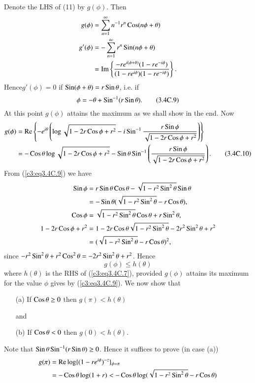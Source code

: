 \medskip
{}
Denote the LHS of (11) by $g(\phi)$. Then
\begin{align*}
g(\phi) & = \sum\limits^\infty_{n=1} n^{-1} r^n \operatorname{Cos} (n\phi + \theta)\\
g'(\phi) & = -\sum\limits^{\infty}_{n=1} r^n \operatorname{Sin} (n\phi + \theta)\\
& = \operatorname{Im} \left\{ \frac{-re^{i(\phi + \theta)} (1-re^{-i\phi})}{(1-re^{i\phi}) (1-re^{-i\phi})}\right\}. 
\end{align*}
Hence\pageoriginale $g'(\phi) = 0$ if $\operatorname{Sin} (\phi + \theta) = r \operatorname{Sin} \theta$, i.e. if
\begin{equation*}
\phi = -\theta + \operatorname{Sin}^{-1} (r \operatorname{Sin} \theta).  \tag{3.4C.9}\label{c3:eq3.4C.9}
\end{equation*}
At this point $g(\phi)$ attains the maximum as we shall show in the end. Now
{\fontsize{10}{12}\selectfont
\begin{align*}
g(\phi) & = \operatorname{Re} \left\{ -e^{i\theta} \left(\log \sqrt{1-2r \operatorname{Cos} \phi + r^2} - i \operatorname{Sin}^{-1} \frac{r \operatorname{Sin} \phi}{\sqrt{1 - 2 r \operatorname{Cos} \phi + r^2}} \right)\right\}\\
& = - \operatorname{Cos} \theta \log \sqrt{1-2r \operatorname{Cos} \phi + r^2} - \operatorname{Sin} \theta \operatorname{Sin}^{-1} \left( \frac{r \operatorname{Sin} \phi}{\sqrt{1-2r \operatorname{Cos} \phi + r^2}}\right). \tag{3.4C.10}\label{c3:eq3.4C.10}
\end{align*}}
From (\ref{c3:eq3.4C.9}) we have
\begin{align*}
\operatorname{Sin} \phi & = r \operatorname{Sin} \theta \operatorname{Cos} \theta - \sqrt{1-r^2 \operatorname{Sin}^2 \theta} \operatorname{Sin} \theta\\
& = - \operatorname{Sin} \theta (\sqrt{1-r^2 \operatorname{Sin}^2 \theta} - r \operatorname{Cos} \theta),\\
\operatorname{Cos} \phi & = \sqrt{1-r^2 \operatorname{Sin}^2 \theta} \operatorname{Cos} \theta + r \operatorname{Sin}^2 \theta,\\
1-2r\operatorname{Cos} \phi + r^2 & = 1 -2r \operatorname{Cos} \theta \sqrt{1-r^2 \operatorname{Sin}^2 \theta} - 2r^2 \operatorname{Sin}^2 \theta + r^2\\
& = (\sqrt{1-r^2 \operatorname{Sin}^2 \theta} - r \operatorname{Cos} \theta)^2,
\end{align*}
since $-r^2 \operatorname{Sin}^2 \theta + r^2 \operatorname{Cos}^2 \theta = -2r^2 \operatorname{Sin}^2 \theta + r^2$. Hence
\begin{equation*}
g(\phi) \leq h (\theta) \tag{3.4C.11}\label{c3:eq3.4C.11}
\end{equation*}
where $h(\theta)$ is the RHS of (\ref{c3:eq3.4C.7}), provided $g(\phi)$ attains its maximum for the value $\phi$ gives by (\ref{c3:eq3.4C.9}). We now show that
\begin{itemize}
\item[{\rm (a)}] If $\operatorname{Cos} \theta \geq 0$ then $g(\pi) < h (\theta)$

and

\item[{\rm (b)}] If $\operatorname{Cos} \theta < 0$ then $g(0) < h (\theta)$.
\end{itemize}
Note that $\operatorname{Sin} \theta \operatorname{Sin}^{-1} (r \operatorname{Sin} \theta) \geq 0$. Hence it suffices to prove (in case (a))
\begin{align*}
g(\pi) & = \operatorname{Re} \log \{(1-re^{i\phi})^{-z}\}_{\phi = \pi}\\
& = -\operatorname{Cos} \theta \log (1+r) < -\operatorname{Cos} \theta \log (\sqrt{1-r^2 \operatorname{Sin}^2 \theta} - r \operatorname{Cos} \theta)
\end{align*}


